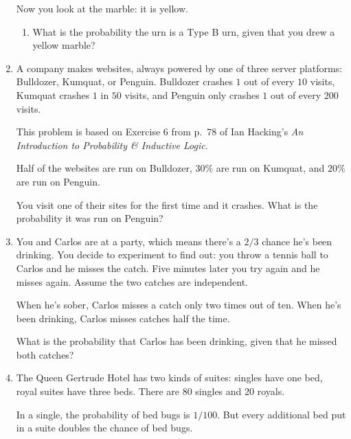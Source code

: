 \documentclass[]{tufte-book}
\providecommand{\tightlist}{%
  \setlength{\itemsep}{0pt}\setlength{\parskip}{0pt}}
\begin{document}
\begin{enumerate}
  Now you look at the marble: it is yellow.

  \begin{enumerate}
  \def\labelenumii{\alph{enumii}.}
  \setcounter{enumii}{1}
  \tightlist
  \item
    What is the probability the urn is a Type B urn, given that you drew a yellow marble?
  \end{enumerate}
\item
  A company makes websites, always powered by one of three server platforms: Bulldozer, Kumquat, or Penguin. Bulldozer crashes \(1\) out of every \(10\) visits, Kumquat crashes \(1\) in \(50\) visits, and Penguin only crashes \(1\) out of every \(200\) visits.

  \begin{marginfigure}
   This problem is based on Exercise 6 from p.~78 of Ian Hacking's \emph{An
   Introduction to Probability \& Inductive Logic}.
   \end{marginfigure}

  Half of the websites are run on Bulldozer, \(30\%\) are run on Kumquat, and \(20\%\) are run on Penguin.

  You visit one of their sites for the first time and it crashes. What is the probability it was run on Penguin?
\item
  You and Carlos are at a party, which means there's a \(2/3\) chance he's been drinking. You decide to experiment to find out: you throw a tennis ball to Carlos and he misses the catch. Five minutes later you try again and he misses again. Assume the two catches are independent.

  When he's sober, Carlos misses a catch only two times out of ten. When he's been drinking, Carlos misses catches half the time.

  What is the probability that Carlos has been drinking, given that he missed both catches?
\item
  The Queen Gertrude Hotel has two kinds of suites: singles have one bed, royal suites have three beds. There are \(80\) singles and \(20\) royals.

  In a single, the probability of bed bugs is \(1/100\). But every additional bed put in a suite doubles the chance of bed bugs.


\end{enumerate}
\end{document}
